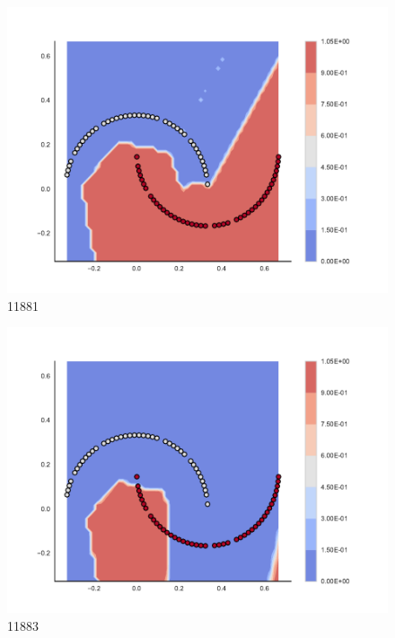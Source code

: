 \begin{subfigure}[b]{0.09\textwidth}
    \includegraphics[clip, trim=2.35cm 1.75cm 4.5cm 0cm,width=\textwidth]{img/convergence/11881.pdf}
    \caption{11881}
    \label{fig:convergence_11881}
\end{subfigure}
%
\begin{subfigure}[b]{0.09\textwidth}
    \includegraphics[clip, trim=2.35cm 1.75cm 4.5cm 0cm,width=\textwidth]{img/convergence/11883.pdf}
    \caption{11883}
    \label{fig:convergence_11883}
\end{subfigure}
%
